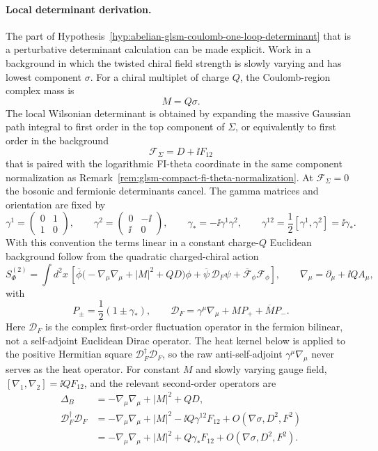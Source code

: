 \paragraph{Local determinant derivation.}
The part of Hypothesis~\ref{hyp:abelian-glsm-coulomb-one-loop-determinant}
that is a perturbative determinant calculation can be made explicit.  Work in
a background in which the twisted chiral field strength is slowly varying and
has lowest component \(\sigma\).  For a chiral multiplet of charge \(Q\), the
Coulomb-region complex mass is
\[
  M=Q\sigma .
\]
The local Wilsonian determinant is obtained by expanding the massive
Gaussian path integral to first order in the top component of \(\Sigma\), or
equivalently to first order in the background
\[
  \mathcal F_\Sigma=D+\ii F_{12}
\]
that is paired with the logarithmic FI-theta coordinate in the same component
normalization as Remark~\ref{rem:glsm-compact-fi-theta-normalization}.  At
\(\mathcal F_\Sigma=0\) the bosonic and fermionic determinants cancel.  The
gamma matrices and orientation are fixed by
\[
  \gamma^1=
  \begin{pmatrix}0&1\\ 1&0\end{pmatrix},
  \qquad
  \gamma^2=
  \begin{pmatrix}0&-\ii\\ \ii&0\end{pmatrix},
  \qquad
  \gamma_*=-\ii\gamma^1\gamma^2,
  \qquad
  \gamma^{12}=\frac12[\gamma^1,\gamma^2]=\ii\gamma_* .
\]
With this convention the terms linear in a constant charge-\(Q\) Euclidean
background follow from the quadratic charged-chiral action
\[
  S_{\Phi}^{(2)}
  =
  \int d^2x\,
  \left[
    \overline\phi
    \bigl(-\nabla_\mu\nabla_\mu+|M|^2+QD\bigr)\phi
    +
    \overline\psi\,\mathcal D_F\psi
    +
    \overline{\mathcal F}_\phi{\mathcal F}_\phi
  \right],
  \qquad
  \nabla_\mu=\partial_\mu+\ii Q A_\mu ,
\]
with
\[
  P_\pm=\frac12(1\pm\gamma_*),
  \qquad
  \mathcal D_F=\gamma^\mu\nabla_\mu+M P_+ +\overline M P_- .
\]
Here \(\mathcal D_F\) is the complex first-order fluctuation operator in the
fermion bilinear, not a self-adjoint Euclidean Dirac operator.  The heat
kernel below is applied to the positive Hermitian square
\(\mathcal D_F^\dagger\mathcal D_F\), so the raw anti-self-adjoint
\(\gamma^\mu\nabla_\mu\) never serves as the heat operator.
For constant \(M\) and slowly varying gauge field,
\([\nabla_1,\nabla_2]=\ii QF_{12}\), and the relevant second-order operators
are
\[
  \begin{aligned}
  \Delta_B
  &=
  -\nabla_\mu\nabla_\mu+|M|^2+QD,
  \\
  \mathcal D_F^\dagger\mathcal D_F
  &=
  -\nabla_\mu\nabla_\mu+|M|^2
  -\ii Q\gamma^{12}F_{12}
  +O(\nabla\sigma,D^2,F^2)
  \\
  &=
  -\nabla_\mu\nabla_\mu+|M|^2
  +Q\gamma_*F_{12}
  +O(\nabla\sigma,D^2,F^2).
  \end{aligned}
\]
